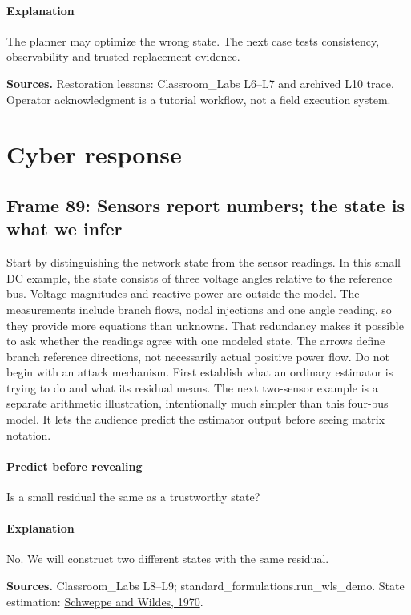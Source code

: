 \documentclass[11pt]{article}
\begin{document}
\paragraph{Explanation}The planner may optimize the wrong state. The next case tests consistency, observability and trusted replacement evidence.
\par\nopagebreak\begin{minipage}{\linewidth}{\footnotesize\color{slate}\textbf{Sources.} Restoration lessons: Classroom\_Labs L6--L7 and archived L10 trace. Operator acknowledgment is a tutorial workflow, not a field execution system.\par}\end{minipage}\par\medskip
\clearpage\section{Cyber response}
\subsection*{Frame 89: Sensors report numbers; the state is what we infer}
Start by distinguishing the network state from the sensor readings. In this small DC example, the state consists of three voltage angles relative to the reference bus. Voltage magnitudes and reactive power are outside the model. The measurements include branch flows, nodal injections and one angle reading, so they provide more equations than unknowns. That redundancy makes it possible to ask whether the readings agree with one modeled state. The arrows define branch reference directions, not necessarily actual positive power flow. Do not begin with an attack mechanism. First establish what an ordinary estimator is trying to do and what its residual means. The next two-sensor example is a separate arithmetic illustration, intentionally much simpler than this four-bus model. It lets the audience predict the estimator output before seeing matrix notation.\par
\paragraph{Predict before revealing}Is a small residual the same as a trustworthy state?
\paragraph{Explanation}No. We will construct two different states with the same residual.
\par\nopagebreak\begin{minipage}{\linewidth}{\footnotesize\color{slate}\textbf{Sources.} Classroom\_Labs L8--L9; standard\_formulations.run\_wls\_demo. State estimation: \href{https://doi.org/10.1109/TPAS.1970.292678}{Schweppe and Wildes, 1970}.\par}\end{minipage}\par\medskip
\end{document}
